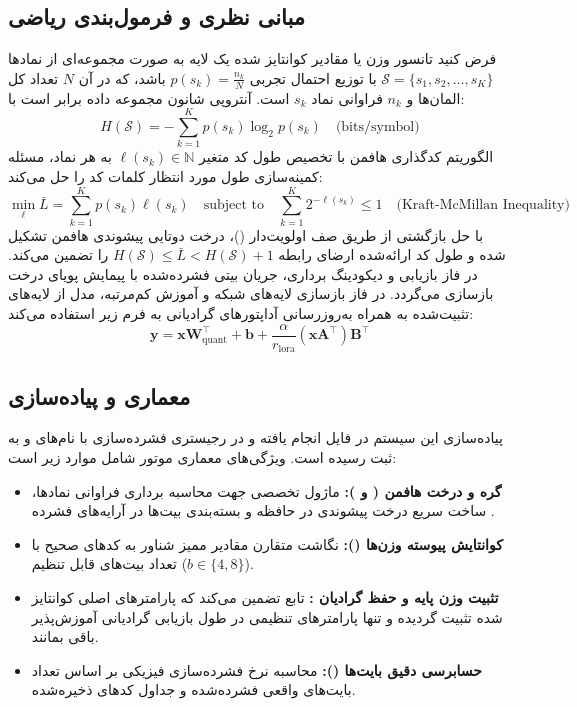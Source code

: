 \subsection{مبانی نظری و فرمول‌بندی ریاضی}
فرض کنید تانسور وزن یا مقادیر کوانتایز شده یک لایه به صورت مجموعه‌ای از نمادها $\mathcal{S} = \{s_1, s_2, \dots, s_K\}$ با توزیع احتمال تجربی $p(s_k) = \frac{n_k}{N}$ باشد، که در آن $N$ تعداد کل المان‌ها و $n_k$ فراوانی نماد $s_k$ است. آنتروپی شانون مجموعه داده برابر است با:
\begin{equation}
H(\mathcal{S}) = -\sum_{k=1}^K p(s_k) \log_2 p(s_k) \quad \text{(bits/symbol)}
\end{equation}
الگوریتم کدگذاری هافمن با تخصیص طول کد متغیر $\ell(s_k) \in \mathbb{N}$ به هر نماد، مسئله کمینه‌سازی طول مورد انتظار کلمات کد را حل می‌کند:
\begin{equation}
\min_{\ell} \bar{L} = \sum_{k=1}^K p(s_k) \ell(s_k) \quad \text{subject to} \quad \sum_{k=1}^K 2^{-\ell(s_k)} \le 1 \quad \text{(Kraft-McMillan Inequality)}
\end{equation}
با حل بازگشتی از طریق صف اولویت‌دار ()، درخت دوتایی پیشوندی هافمن تشکیل شده و طول کد ارائه‌شده ارضای رابطه $H(\mathcal{S}) \le \bar{L} < H(\mathcal{S}) + 1$ را تضمین می‌کند. در فاز بازیابی و دیکودینگ برداری، جریان بیتی فشرده‌شده با پیمایش پویای درخت بازسازی می‌گردد. در فاز بازسازی لایه‌های شبکه و آموزش کم‌مرتبه، مدل از لایه‌های تثبیت‌شده به همراه به‌روزرسانی آداپتورهای گرادیانی به فرم زیر استفاده می‌کند:
\begin{equation}
\mathbf{y} = \mathbf{x} \mathbf{W}_{\text{quant}}^\top + \mathbf{b} + \frac{\alpha}{r_{\text{lora}}} (\mathbf{x} \mathbf{A}^\top) \mathbf{B}^\top
\end{equation}

\subsection{معماری و پیاده‌سازی}
پیاده‌سازی این سیستم در فایل  انجام یافته و در رجیستری فشرده‌سازی با نام‌های  و  به ثبت رسیده است. ویژگی‌های معماری موتور شامل موارد زیر است:
\begin{itemize}
    \item \textbf{گره و درخت هافمن ( و ):} ماژول تخصصی جهت محاسبه برداری فراوانی نمادها، ساخت سریع درخت پیشوندی در حافظه و بسته‌بندی بیت‌ها در آرایه‌های فشرده .
    \item \textbf{کوانتایش پیوسته وزن‌ها ():} نگاشت متقارن مقادیر ممیز شناور به کدهای صحیح با تعداد بیت‌های قابل تنظیم ($b \in \{4, 8\}$).
    \item \textbf{تثبیت وزن پایه و حفظ گرادیان :} تابع  تضمین می‌کند که پارامترهای اصلی کوانتایز شده تثبیت گردیده و تنها پارامترهای تنظیمی  در طول بازیابی گرادیانی آموزش‌پذیر باقی بمانند.
    \item \textbf{حسابرسی دقیق بایت‌ها ():} محاسبه نرخ فشرده‌سازی فیزیکی بر اساس تعداد بایت‌های واقعی فشرده‌شده و جداول کدهای ذخیره‌شده.
\end{itemize}

